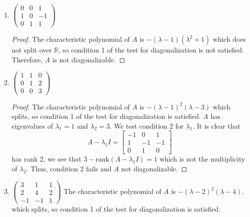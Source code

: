 \documentclass[11pt]{scrartcl}
\begin{document}
\begin{enumerate}[label=\alph*.]
{\begin{proof}
	      \end{proof}
	      }
	\item{
	      $\left(\begin{array}{lll}0 & 0 & 1 \\ 1 & 0 & -1 \\ 0 & 1 & 1\end{array}\right)$
	      \begin{proof}
		      The characteristic polynomial of $A$ is $-(\lambda-1)(\lambda^2+1)$
		      which does not split over $\mathbb{R}$, so condition 1 of the test for diagonalization is not satisfied.
		      Therefore, $A$ is not diagonalizable.
	      \end{proof}
	      }
	\item{
	      $\left(\begin{array}{lll}1 & 1 & 0 \\ 0 & 1 & 2 \\ 0 & 0 & 3\end{array}\right)$
	      \begin{proof}
		      The characteristic polynomial of $A$ is $-(\lambda-1)^2(\lambda-3)$
		      which splits, so condition 1 of the test for diagonalization is satisfied.
		      $A$ has eigenvalues of $\lambda_1 = 1 $ and $\lambda_2 = 3$.
		      We test condition 2 for $\lambda_1$.
		      It is clear that
		      \[
			      A - \lambda_1 I =
			      \begin{bmatrix}
				      -1 & 0 & 1 \\ 1 & -1 & -1 \\ 0 & 1 & 0
			      \end{bmatrix}
		      \]
		      has rank 2, we see that $3 - \text{rank}(A - \lambda_1 I) = 1$ which is not the multiplicity of $\lambda_2$.
		      Thus, condition 2 fails and $A$ not diagonalizable.
	      \end{proof}
	      }
	\item{
	      $\left(\begin{array}{ccc}3 & 1 & 1 \\ 2 & 4 & 2 \\ -1 & -1 & 1\end{array}\right)$
	      The characteristic polynomial of $A$ is $-(\lambda-2)^2(\lambda-4)$.
	      which splits, so condition 1 of the test for diagonalization is satisfied.
}
\end{enumerate}
\end{document}
